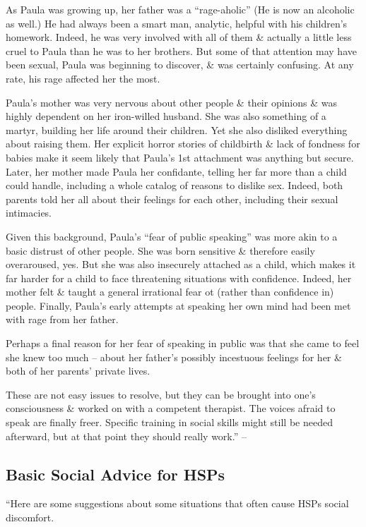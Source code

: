 \documentclass{article}
\numberwithin{equation}{section}
\begin{document}
As Paula was growing up, her father was a ``rage-aholic'' (He is now an alcoholic as well.) He had always been a smart man, analytic, helpful with his children's homework. Indeed, he was very involved with all of them \& actually a little less cruel to Paula than he was to her brothers. But some of that attention may have been sexual, Paula was beginning to discover, \& was certainly confusing. At any rate, his rage affected her the most.

Paula's mother was very nervous about other people \& their opinions \& was highly dependent on her iron-willed husband. She was also something of a martyr, building her life around their children. Yet she also disliked everything about raising them. Her explicit horror stories of childbirth \& lack of fondness for babies make it seem likely that Paula's 1st attachment was anything but secure. Later, her mother made Paula her confidante, telling her far more than a child could handle, including a whole catalog of reasons to dislike sex. Indeed, both parents told her all about their feelings for each other, including their sexual intimacies.

Given this background, Paula's ``fear of public speaking'' was more akin to a basic distrust of other people. She was born sensitive \& therefore easily overaroused, yes. But she was also insecurely attached as a child, which makes it far harder for a child to face threatening situations with confidence. Indeed, her mother felt \& taught a general irrational fear ot (rather than confidence in) people. Finally, Paula's early attempts at speaking her own mind had been met with rage from her father.

Perhaps a final reason for her fear of speaking in public was that she came to feel she knew too much -- about her father's possibly incestuous feelings for her \& both of her parents' private lives.

These are not easy issues to resolve, but they can be brought into one's consciousness \& worked on with a competent therapist. The voices afraid to speak are finally freer. Specific training in social skills might still be needed afterward, but at that point they should really work.'' -- \cite[pp. 138--139]{Aron2013}

\subsection{Basic Social Advice for HSPs}
``Here are some suggestions about some situations that often cause HSPs social discomfort.
\end{document}
